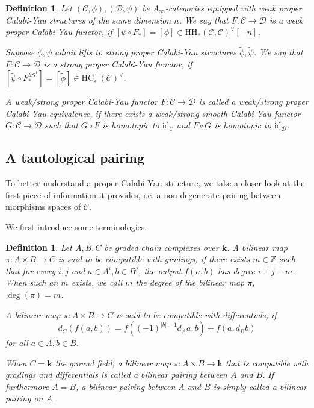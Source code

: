 \documentclass[11pt]{amsproc}
\def\Z{{\mathbb Z}}
\def\K{{\mathbf{k}}}
\def\cc{\mathcal{C}}
\def\dd{\mathcal{D}}
\def\r#1{\mathrm{#1}}
\def\ainf{A_\infty}
\def\id{\mathrm{id}}
\newtheorem{defn}[lem]{Definition}
\theoremstyle{remark}
\numberwithin{equation}{section}
\begin{document}
\begin{defn}\label{def: weak proper cy functor}
Let $(\cc, \phi), (\dd, \psi)$ be $\ainf$-categories equipped with weak proper Calabi-Yau structures of the same dimension $n$.
We say that $F: \cc \to \dd$ is a weak proper Calabi-Yau functor, 
if $[\psi \circ F_{*}] = [\phi] \in \r{HH}_{*}(\cc, \cc)^{\vee}[-n]$.

Suppose $\phi, \psi$ admit lifts to strong proper Calabi-Yau structures $\tilde{\phi}, \tilde{\psi}$. 
We say that $F: \cc \to \dd$ is a strong proper Calabi-Yau functor,
if $[\tilde{\psi} \circ F_{*}^{hS^{1}}] = [\tilde{\phi}] \in \r{HC}_{*}^{+}(\cc)^{\vee}$. %

A weak/strong proper Calabi-Yau functor $F: \cc \to \dd$ is called a weak/strong proper Calabi-Yau equivalence,
if there exists a weak/strong smooth Calabi-Yau functor $G: \cc \to \dd$ such that $G \circ F$ is homotopic to $\id_{\cc}$ and $F \circ G$ is homotopic to $\id_{\dd}$.
\end{defn}

\subsection{A tautological pairing}\label{section: taut pairing}

To better understand a proper Calabi-Yau structure,
we take a closer look at the first piece of information it provides, i.e. a non-degenerate pairing between morphisms spaces of $\cc$.

We first introduce some terminologies. 

\begin{defn}\label{def: bilinear pairings}
Let $A, B, C$ be graded chain complexes over $\K$.
A bilinear map $\pi: A \times B \to C$ is said to be compatible with gradings, 
if there exists $m \in \Z$ such that for every $i, j$ and $a \in A^{i}, b \in B^{j}$, the output $f(a, b)$ has degree $i+j+m$.
When such an $m$ exists, we call $m$ the degree of the bilinear map $\pi$, $\deg(\pi) = m$.

A bilinear map $\pi: A \times B \to C$ is said to be compatible with differentials, if
\begin{equation}\label{graded leibniz}
d_{C}(f(a, b)) = f( (-1)^{|b| - 1} d_{A} a, b) + f(a, d_{B} b)
\end{equation}
for all $a \in A, b \in B$.

When $C = \K$ the ground field, a bilinear map $\pi: A \times B \to \K$ that is compatible with gradings and differentials is called a bilinear pairing between $A$ and $B$. 
If furthermore $A=B$, a bilinear pairing between $A$ and $B$ is simply called a bilinear pairing on $A$.
\end{defn}
\end{document}
